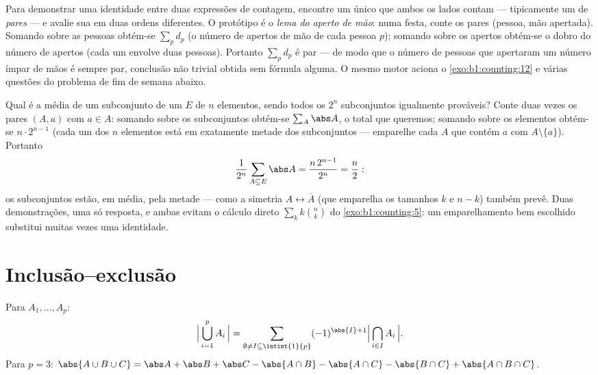 \begin{method}\label{met:b1:counting:doublecount}
Para demonstrar uma identidade entre duas expressões de contagem,
encontre um único  que ambos os lados contam ---
tipicamente um  de \emph{pares} --- e avalie sua 
em duas ordens diferentes. O protótipo é o \emph{lema do aperto de
mão}: numa festa, conte os pares (pessoa, mão apertada). Somando sobre
as pessoas obtém-se $\sum_p d_p$ (o número de apertos de mão de cada
pessoa $p$); somando sobre os apertos obtém-se o dobro do número de
apertos (cada um envolve duas pessoas). Portanto $\sum_p d_p$ é par
--- de modo que o número de pessoas que apertaram um número ímpar de
mãos é sempre par, conclusão não trivial obtida sem fórmula alguma. O
mesmo motor aciona o \cref{exo:b1:counting:12} e várias questões do problema
de fim de semana abaixo.
\end{method}

\begin{example}\label{ex:b1:counting:averagesubset}
Qual é a  média de um subconjunto de um  $E$ de $n$
elementos, sendo todos os $2^n$ subconjuntos igualmente prováveis?
Conte duas vezes os pares $(A, a)$ com $a \in A$: somando sobre os
subconjuntos obtém-se $\sum_A \abs A$, o total que queremos; somando sobre
os elementos obtém-se $n \cdot 2^{n-1}$ (cada um dos $n$ elementos está em
exatamente metade dos subconjuntos --- emparelhe cada $A$ que contém
$a$ com $A
\setminus \{a\}$). Portanto
\[
\frac{1}{2^n}\sum_{A \subseteq E} \abs A
= \frac{n\,2^{n-1}}{2^n} = \frac n2 :
\]
os subconjuntos estão, em média, pela metade --- como a simetria $A
\leftrightarrow \overline A$ (que emparelha os tamanhos $k$ e $n - k$)
também prevê. Duas demonstrações, uma só resposta, e ambas evitam o
cálculo direto $\sum_k k\binom nk$ do \cref{exo:b1:counting:5}: um
emparelhamento bem escolhido substitui muitas vezes uma identidade.
\end{example}

\section{Inclusão--exclusão}

\begin{theorem}\label{thm:b1:counting:inclexcl}
Para  $A_1, \dots, A_p$:
\[
\Bigl|\, \bigcup_{i=1}^{p} A_i \,\Bigr|
= \sum_{\emptyset \neq I \subseteq \intint{1}{p}}
(-1)^{\abs{I}+1} \Bigl|\, \bigcap_{i \in I} A_i \,\Bigr| .
\]
Para $p = 3$:
$\abs{A \cup B \cup C} = \abs A + \abs B + \abs C - \abs{A \cap B} -
\abs{A \cap C} - \abs{B \cap C} + \abs{A \cap B \cap C}$.
\end{theorem}

